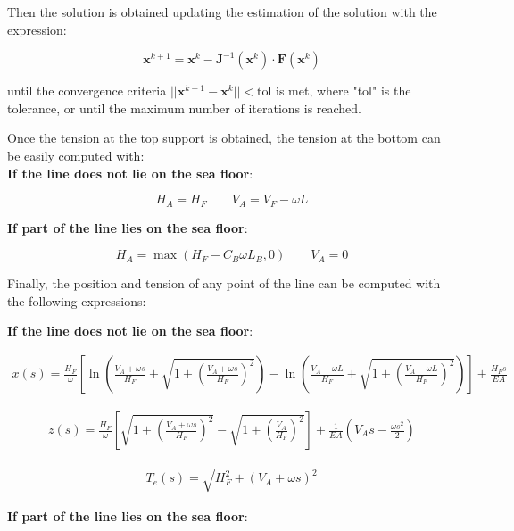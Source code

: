 \documentclass[10pt] {article}
\newcommand{\bean}{\begin{eqnarray}}
\newcommand{\eean}{\end{eqnarray}}
\newcommand{\om}{\omega}
\begin{document}
Then the solution is obtained updating the estimation of the solution with the expression:

$$\mathbf{x}^{k+1} = \mathbf{x}^{k} - \mathbf{J}^{-1}(\mathbf{x}^{k})\cdot\mathbf{F}(\mathbf{x}^{k})$$

until the convergence criteria $||\mathbf{x}^{k+1} - \mathbf{x}^{k}||< \text{tol}$ is met, where "tol" is the tolerance, or until the maximum number of iterations is reached.


Once the tension at the top support is obtained, the tension at the bottom can be easily computed with:\\

\hspace{1cm}\textbf{If the line does not lie on the sea floor}:

\begin{equation}
\nonumber
H_{A} = H_{F} \qquad V_{A} = V_{F} - \om L
\end{equation}

\vspace{1cm}
\hspace{1cm}\textbf{If part of the line lies on the sea floor}:

\begin{equation}
\nonumber
H_{A} = \max(H_{F} - C_{B} \om L_{B},0) \qquad V_{A} = 0
\end{equation}


\vspace{1cm}

Finally, the position and tension of any point of the line can be computed with the following expressions:


\hspace{1cm}\textbf{If the line does not lie on the sea floor}:

\bean
\nonumber
x(s) = \frac{H_{F}}{\om} \left[ \ln \left( \frac{V_{A} + \om s}{H_{F}} + \sqrt{1+\left( \frac{V_{A}+\om s}{H_{F}} \right)^{2} } \right) - \ln \left( \frac{V_{A}-\om L}{H_{F}} + \sqrt{1+\left( \frac{V_{A}-\om L}{H_{F}} \right)^{2} } \right) \right] + \frac{H_{F} s}{EA} 
\eean

\bean
\nonumber
z(s) = \frac{H_{F}}{\om} \left[\sqrt{1+\left( \frac{V_{A}+\om s}{H_{F}} \right)^{2} } - \sqrt{1+\left( \frac{V_{A}}{H_{F}} \right)^{2} } \right] + \frac{1}{EA} \left( V_{A} s - \frac{\om s^{2}}{2}\right)
\eean

\bean
\nonumber
T_{e}(s) = \sqrt{H_{F}^{2} + (V_{A} + \om s)^{2}}
\eean

\vspace{1cm}
\hspace{1cm}\textbf{If part of the line lies on the sea floor}:
\end{document}
